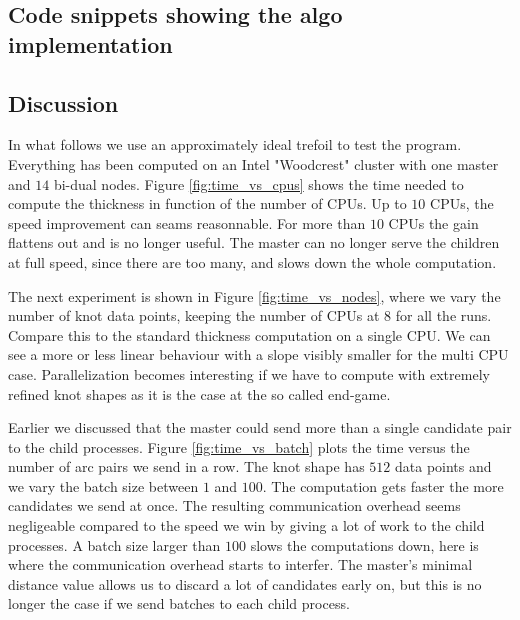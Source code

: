 \documentclass{article}
\begin{document}
\subsection{Code snippets showing the algo implementation}

\subsection{Discussion}

In what follows we use an approximately ideal trefoil to test the program. Everything
has been computed on an Intel "Woodcrest" cluster with one master and $14$ bi-dual nodes.
Figure \ref{fig:time_vs_cpus} shows the time needed to compute the thickness in function
of the number of CPUs. Up to $10$ CPUs, the speed improvement can seams reasonnable. For more
than $10$ CPUs the gain flattens out and is no longer useful. The master can no longer
serve the children at full speed, since there are too many, and slows down the whole computation.

The next experiment is shown in Figure \ref{fig:time_vs_nodes}, where we vary the number of
knot data points, keeping the number of CPUs at $8$ for all the runs. Compare this to the
standard thickness computation on a single CPU. We can see a more or less linear behaviour with
a slope visibly smaller for the multi CPU case. Parallelization becomes interesting if we
have to compute with extremely refined knot shapes as it is the case at the so called end-game.

Earlier we discussed that the master could send more than a single candidate pair to the
child processes. Figure \ref{fig:time_vs_batch} plots the time versus the number of arc
pairs we send in a row. The knot shape has $512$ data points and we vary the batch size
between $1$ and $100$. The computation gets faster the more candidates we send at once.
The resulting communication overhead seems negligeable compared to the speed we win by giving a
lot of work to the child processes. A batch size larger than $100$ slows the computations
down, here is where the communication overhead starts to interfer. The master's minimal distance
value allows us to discard a lot of candidates early on, but this is no longer the case if
we send batches to each child process.
\end{document}
